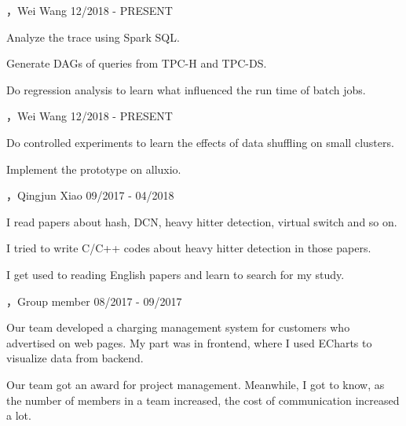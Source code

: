 \vspace{-6.0mm}

\begin{cventries}

\cvexperience
{，Wei Wang}
{12/2018 - PRESENT}
{
    \begin{cvitems}
    \item {Analyze the trace using Spark SQL.}
    \item {Generate DAGs of queries from TPC-H and TPC-DS.}
    \item {Do regression analysis to learn what influenced the run time of batch jobs.}
    \end{cvitems}
}

\cvexperience
{，Wei Wang}
{12/2018 - PRESENT}
{
    \begin{cvitems}
    \item {Do controlled experiments to learn the effects of data shuffling on small clusters.}
    \item {Implement the prototype on alluxio.}
    \end{cvitems}
}

\cvexperience
{，Qingjun Xiao}
{09/2017 - 04/2018}
{
    \begin{cvitems}
    \item {I read papers about hash, DCN, heavy hitter detection, virtual switch and so on.}
    \item {I tried to write C/C++ codes about heavy hitter detection in those papers.}
    \item {I get used to reading English papers and learn to search for my study.}
    \end{cvitems}
}

\cvexperience
{，Group member}
{08/2017 - 09/2017}
{
    \begin{cvitems}
    \item {Our team developed a charging management system for customers who advertised on web pages. My part was in frontend, where I used ECharts to visualize data from backend.}
    \item {Our team got an award for project management. Meanwhile, I got to know, as the number of members in a team increased, the cost of communication increased a lot.}
    \end{cvitems}
}


\end{cventries}
